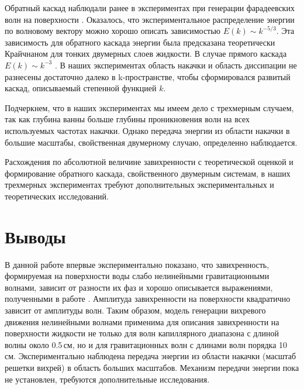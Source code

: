 Обратный каскад наблюдали ранее в экспериментах при генерации фарадеевских волн на поверхности \cite{Francois2014}. Оказалось, что экспериментальное распределение энергии по волновому вектору можно хорошо описать зависимостью $E(k) \sim k^{-5/3}$. Эта зависимость для обратного каскада энергии была предсказана теоретически Крайчнаном \cite{Kraichnan1967} для тонких двумерных слоев жидкости. В случае прямого каскада $E(k) \sim k^{-3}$ \cite{Kraichnan1967}. В наших экспериментах область накачки и область диссипации не разнесены достаточно далеко в k-пространстве, чтобы сформировался развитый каскад, описываемый степенной функцией $k$.

Подчеркнем, что в наших экспериментах мы имеем дело с трехмерным случаем, так как глубина ванны больше глубины проникновения волн на всех используемых частотах накачки. Однако передача энергии из области накачки в большие масштабы, свойственная двумерному случаю, определенно наблюдается. 

Расхождения по абсолютной величине завихренности с теоретической оценкой и формирование обратного каскада, свойственного двумерным системам, в наших трехмерных экспериментах требуют дополнительных экспериментальных и теоретических исследований.

\section{Выводы} \label{sect4_5}
В данной работе впервые экспериментально показано, что завихренность, формируемая на поверхности воды слабо нелинейными гравитационными волнами, зависит от разности их фаз и хорошо описывается выражениями, полученными в работе \cite{F6}. Амплитуда завихренности на поверхности квадратично зависит от амплитуды волн. Таким образом, модель генерации вихревого движения нелинейными волнами применима для описания завихренности на поверхности жидкости не только для волн капиллярного диапазона с длиной волны около 0.5\,см, но и для гравитационных волн с длинами волн порядка 10\,см. 
Экспериментально наблюдена передача энергии из области накачки (масштаб решетки вихрей) в область больших масштабов. Механизм передачи энергии пока не установлен, требуются дополнительные исследования.

\clearpage